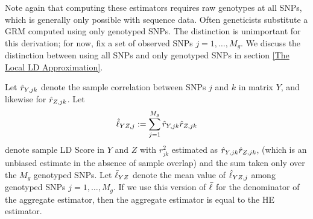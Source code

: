 \documentclass[11pt]{article}
\numberwithin{equation}{section}
\numberwithin{definition}{section}
\numberwithin{thm}{section}
\numberwithin{lemma}{section}
\numberwithin{prop}{section}
\numberwithin{cor}{section}
\numberwithin{hyp}{section}
\begin{document}
Note again that computing these estimators requires raw genotypes at all SNPs, 
which is generally only possible with sequence data.
Often geneticists substitute a GRM computed using only genotyped SNPs. 
The distinction is unimportant for this derivation; for now, fix a set of observed SNPs $j=1,\ldots,M_g$. 
We discuss the distinction between using all SNPs and only genotyped SNPs in section \ref{The Local LD Approximation}.

\begin{prop}\label{he_vs_agg_h2}
Let $\hat{r}_{Y,jk}$ denote the sample correlation between SNPs $j$ and $k$ in matrix $Y$, and likewise for $\hat{r}_{Z,jk}$.
Let 
$$\hat{\ell}_{YZ,j} := \sum_{j=1}^{M_g} \hat{r}_{Y,jk}\hat{r}_{Z,jk} $$ 
denote sample LD Score in $Y$ and $Z$ with $r^2_{jk}$ estimated as $\hat{r}_{Y,jk}\hat{r}_{Z,jk}$,
(which is an unbiased estimate in the absence of sample overlap)
and the sum taken only over the $M_g$ genotyped SNPs.
Let $\bar{\ell}_{YZ}$ denote the mean value of $\hat{\ell}_{YZ,j}$ among genotyped SNPs $j=1,\ldots,M_g$.
If we use this version of $\bar{\ell}$ for the denominator of the aggregate estimator, 
then the aggregate estimator is equal to the HE estimator. 
\end{prop}
\end{document}
